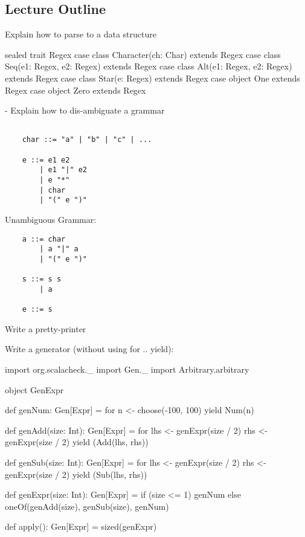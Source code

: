 \newlecture

\begin{instructor}

\section*{Lecture Outline}

Explain how to parse to a data structure

\begin{scalacode}
  sealed trait Regex
  case class Character(ch: Char) extends Regex
  case class Seq(e1: Regex, e2: Regex) extends Regex
  case class Alt(e1: Regex, e2: Regex) extends Regex
  case class Star(e: Regex) extends Regex
  case object One extends Regex
  case object Zero extends Regex
\end{scalacode}

- Explain how to dis-ambiguate a grammar

\begin{verbatim}

    char ::= "a" | "b" | "c" | ...

    e ::= e1 e2
        | e1 "|" e2
        | e "*"
        | char
        | "(" e ")"
\end{verbatim}

Unambiguous Grammar:

\begin{verbatim}
    a ::= char
        | a "|" a
        | "(" e ")"

    s ::= s s
        | a

    e ::= s
\end{verbatim}

Write a pretty-printer


Write a generator (without using for .. yield):

\begin{scalacode}
  import org.scalacheck._
  import Gen._
  import Arbitrary.arbitrary

  object GenExpr {

    def genNum: Gen[Expr] = for {
      n <- choose(-100, 100)
    } yield Num(n)

    def genAdd(size: Int): Gen[Expr] = for {
      lhs <- genExpr(size / 2)
      rhs <- genExpr(size / 2)
    } yield (Add(lhs, rhs))

    def genSub(size: Int): Gen[Expr] = for {
      lhs <- genExpr(size / 2)
      rhs <- genExpr(size / 2)
    } yield (Sub(lhs, rhs))

    def genExpr(size: Int): Gen[Expr] = {
      if (size <= 1) {
        genNum
      }
      else {
        oneOf(genAdd(size), genSub(size), genNum)
      }
    }

    def apply(): Gen[Expr] = sized(genExpr)

  }
\end{scalacode}

\end{instructor}


